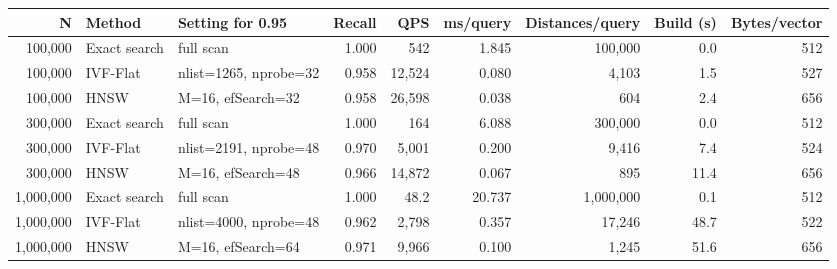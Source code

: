 \begin{tabular}{rllrrrrrr}
\toprule
N & Method & Setting for 0.95 & Recall & QPS & ms/query & Distances/query & Build (s) & Bytes/vector \\
\midrule
100,000 & Exact search & full scan & 1.000 & 542 & 1.845 & 100,000 & 0.0 & 512 \\
100,000 & IVF-Flat & nlist=1265, nprobe=32 & 0.958 & 12,524 & 0.080 & 4,103 & 1.5 & 527 \\
100,000 & HNSW & M=16, efSearch=32 & 0.958 & 26,598 & 0.038 & 604 & 2.4 & 656 \\
300,000 & Exact search & full scan & 1.000 & 164 & 6.088 & 300,000 & 0.0 & 512 \\
300,000 & IVF-Flat & nlist=2191, nprobe=48 & 0.970 & 5,001 & 0.200 & 9,416 & 7.4 & 524 \\
300,000 & HNSW & M=16, efSearch=48 & 0.966 & 14,872 & 0.067 & 895 & 11.4 & 656 \\
1,000,000 & Exact search & full scan & 1.000 & 48.2 & 20.737 & 1,000,000 & 0.1 & 512 \\
1,000,000 & IVF-Flat & nlist=4000, nprobe=48 & 0.962 & 2,798 & 0.357 & 17,246 & 48.7 & 522 \\
1,000,000 & HNSW & M=16, efSearch=64 & 0.971 & 9,966 & 0.100 & 1,245 & 51.6 & 656 \\
\bottomrule
\end{tabular}
